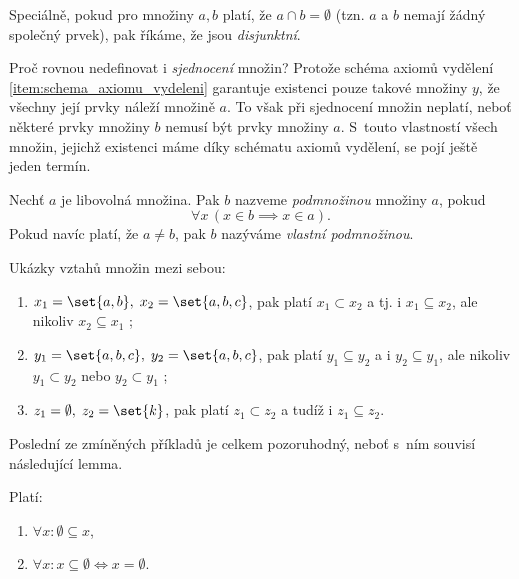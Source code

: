 \begin{remark}
    Speciálně, pokud pro množiny $a,b$ platí, že $a\cap b=\emptyset$ (tzn. $a$ a $b$ nemají žádný společný prvek), pak říkáme, že jsou \emph{disjunktní}.
\end{remark}
Proč rovnou nedefinovat i \emph{sjednocení} množin? Protože schéma axiomů vydělení \ref{item:schema_axiomu_vydeleni} garantuje existenci pouze takové množiny $y$, že všechny její prvky náleží množině $a$. To však při sjednocení množin neplatí, neboť některé prvky množiny $b$ nemusí být prvky množiny $a$. S~touto vlastností všech množin, jejichž existenci máme díky schématu axiomů vydělení, se pojí ještě jeden termín.
\begin{definition}\label{def:podmnozina}
    Nechť $a$ je libovolná množina. Pak $b$ nazveme \emph{podmnožinou} množiny $a$, pokud
    \begin{equation*}
        \forall x\,(x\in b \implies x\in a).
    \end{equation*}
    Pokud navíc platí, že $a\neq b$, pak $b$ nazýváme \emph{vlastní podmnožinou}.
\end{definition}
\begin{example}
    Ukázky vztahů množin mezi sebou:
    \begin{enumerate}[label=(\roman*)]
        \item $x_1=\set{a,b},\; x_2=\set{a,b,c}$, pak platí $x_1 \subset x_2$ a tj. i $x_1 \subseteq x_2$, ale nikoliv $x_2 \subseteq x_1$ ;
        \item $y_1=\set{a,b,c},\; y_2=\set{a,b,c}$, pak platí $y_1 \subseteq y_2$ a i $y_2 \subseteq y_1$, ale nikoliv $y_1 \subset y_2$ nebo $y_2 \subset y_1$ ;
        \item $z_1=\emptyset,\; z_2=\set{k}$, pak platí $z_1 \subset z_2$ a tudíž i $z_1 \subseteq z_2$.
    \end{enumerate}
\end{example}
Poslední ze zmíněných příkladů je celkem pozoruhodný, neboť s~ním souvisí následující lemma.
\begin{lemma}\label{lem:o_prazdne_mnozine}
    Platí:
    \begin{enumerate}[label=(\roman*)]
        \item $\forall x: \emptyset\subseteq x$,
        \item $\forall x: x\subseteq\emptyset\iff x=\emptyset$.
    \end{enumerate}
\end{lemma}
